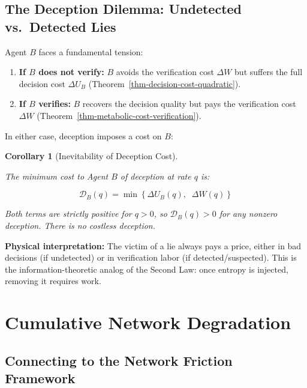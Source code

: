 \documentclass[11pt]{article}
\theoremstyle{plain}
\newtheorem{corollary}[theorem]{Corollary}
\theoremstyle{definition}
\theoremstyle{remark}
\let\origsection\section
\renewcommand{\section}{\needspace{12\baselineskip}\origsection}
\let\origsubsection\subsection
\renewcommand{\subsection}{\needspace{7\baselineskip}\origsubsection}
\providecommand{\tightlist}{%
  \setlength{\itemsep}{0pt}\setlength{\parskip}{0pt}}
\begin{document}
\subsection{The Deception Dilemma: Undetected vs.~Detected
Lies}\label{the-deception-dilemma-undetected-vs.-detected-lies}

Agent \(B\) faces a fundamental tension:

\begin{enumerate}
\def\labelenumi{\arabic{enumi}.}
\tightlist
\item
  \textbf{If \(B\) does not verify:} \(B\) avoids the verification cost
  \(\Delta W\) but suffers the full decision cost \(\Delta U_B\)
  (Theorem~\ref{thm-decision-cost-quadratic}).
\item
  \textbf{If \(B\) verifies:} \(B\) recovers the decision quality but
  pays the verification cost \(\Delta W\)
  (Theorem~\ref{thm-metabolic-cost-verification}).
\end{enumerate}

In either case, deception imposes a cost on \(B\):

\begin{corollary}[Inevitability of Deception Cost]
\label{cor-inevitability-deception-cost}

The minimum cost to Agent $B$ of deception at rate $q$ is:

$$\mathcal{D}_B(q) = \min\left\{\Delta U_B(q), \;\; \Delta W(q) \right\}$$

Both terms are strictly positive for $q > 0$, so $\mathcal{D}_B(q) > 0$ for any nonzero deception. There is no costless deception.
\end{corollary}

\textbf{Physical interpretation:} The victim of a lie always pays a
price, either in bad decisions (if undetected) or in verification labor
(if detected/suspected). This is the information-theoretic analog of the
Second Law: once entropy is injected, removing it requires work.

\section{Cumulative Network
Degradation}\label{cumulative-network-degradation}

\subsection{Connecting to the Network Friction
Framework}\label{connecting-to-the-network-friction-framework}
\end{document}

